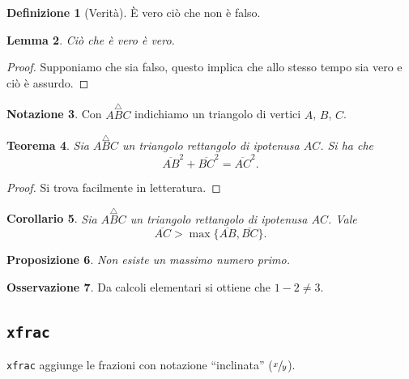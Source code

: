 \documentclass[italian]{tesina-class/tesina}
\theoremstyle{definition}
\newtheorem{definition}{Definizione}[section] %
\newtheorem{notation}[definition]{Notazione}
\newtheorem{remark}[definition]{Osservazione}
\theoremstyle{plain}
\newtheorem{theorem}[definition]{Teorema}
\newtheorem{lemma}[definition]{Lemma}
\newtheorem{corollary}[definition]{Corollario}
\newtheorem{proposition}[definition]{Proposizione}
\begin{document}
\begin{definition}[Verità]
    È vero ciò che non è falso.
\end{definition}

\begin{lemma}
Ciò che è vero è vero.
\end{lemma}
\begin{proof}
Supponiamo che sia falso, questo implica che allo stesso tempo sia vero e ciò è assurdo.
\end{proof}

\begin{notation}
Con $A\overset{\triangle}{B}C$ indichiamo un triangolo di vertici $A$, $B$, $C$.
\end{notation}

\begin{theorem}
Sia $A\overset{\triangle}{B}C$ un triangolo rettangolo di ipotenusa $AC$. Si ha che
\begin{equation*}
\overline{AB}^2 + \overline{BC}^2 = \overline{AC}^2.
\end{equation*}
\end{theorem}
\begin{proof}
Si trova facilmente in letteratura.
\end{proof}

\begin{corollary}
Sia $A\overset{\triangle}{B}C$ un triangolo rettangolo di ipotenusa $AC$. Vale
\begin{equation*}
\overline{AC} > \max \{ \overline{AB}, \overline{BC} \}.
\end{equation*}
\end{corollary}

\begin{proposition}
    Non esiste un massimo numero primo.
\end{proposition}

\begin{remark}
    Da calcoli elementari si ottiene che
    $1 - 2 \not= 3$.
\end{remark}

\subsection{\texttt{xfrac}}

\verb|xfrac| aggiunge le frazioni con notazione \enquote{inclinata} ($\sfrac{x}{y}$).



\newpage
\printbibliography
\end{document}
